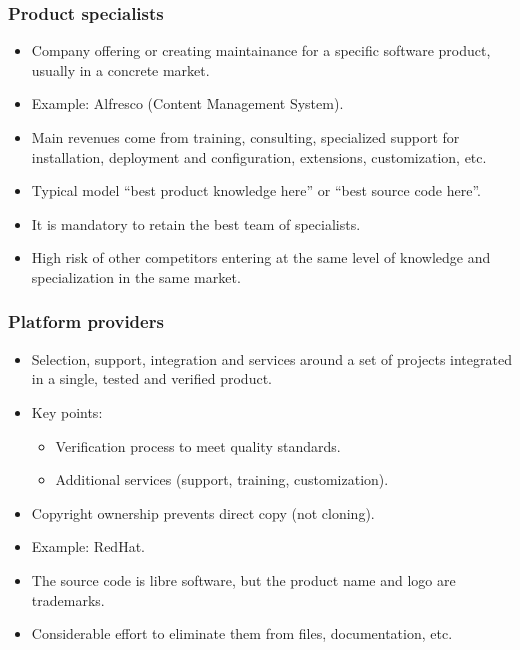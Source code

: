 \begin{frame}
 \frametitle{Product specialists}
 \begin{itemize}
  \item Company offering or creating maintainance for a specific software product, usually in a concrete market.
  \item Example: Alfresco (Content Management System).
  \item Main revenues come from training, consulting, specialized support for installation, deployment and
  configuration, extensions, customization, etc.
  \item Typical model ``best product knowledge here'' or ``best source code here''.
  \item It is mandatory to retain the best team of specialists.
  \item High risk of other competitors entering at the same level of knowledge and specialization in the same
  market.
 \end{itemize}
\end{frame}

\begin{frame}
 \frametitle{Platform providers}
 \begin{itemize}
  \item Selection, support, integration and services around a set of projects integrated in a single, tested
and verified product.
  \item Key points:
  \begin{itemize}
   \item Verification process to meet quality standards.
   \item Additional services (support, training, customization).
  \end{itemize}
  \item Copyright ownership prevents direct copy (not cloning).
  \item Example: RedHat.
  \item The source code is libre software, but the product name and logo are trademarks.
  \item Considerable effort to eliminate them from files, documentation, etc.
 \end{itemize}
\end{frame}


